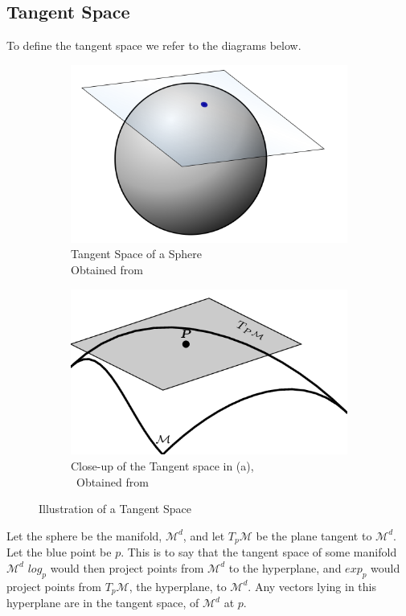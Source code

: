 \documentclass[12pt]{report}
\begin{document}
\subsection{Tangent Space}
To define the tangent space we refer to the diagrams below.\\
\begin{figure}[ht]
\centering
\begin{subfigure}{.5\textwidth}
    \centering
    \includegraphics[scale=0.1]{tangent_space.png}
    \caption{Tangent Space of a Sphere\\ Obtained from \cite{tanspaceimg2}}
    \label{tanspacesphere}
\end{subfigure}%
\begin{subfigure}{.5\textwidth}
    \centering
    \includegraphics[scale=0.35]{tangent_space2.png}
    \caption{Close-up of the Tangent space in (a),\\ \ Obtained from \cite{tanspaceimg}}
    \label{tanspacemanifold}
\end{subfigure}
\caption{Illustration of a Tangent Space}
\label{fig:tanspaces}
\end{figure}
Let the sphere be the manifold, $\mathcal{M}^d$, and let $T_p\mathcal{M}$ 
be the plane tangent to $\mathcal{M}^d$. Let the blue point be $p$.
This is to say that the tangent space of some manifold $\mathcal{M}^d$
$log_p$ would then project points from $\mathcal{M}^d$ to the hyperplane,
and $exp_p$ would project points from $T_p\mathcal{M}$, the hyperplane, to $\mathcal{M}^d$.
Any vectors lying in this hyperplane are in the tangent space,
of $\mathcal{M}^d$ at $p$.
\end{document}
